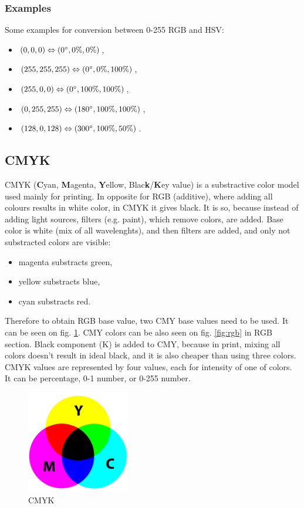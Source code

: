 \documentclass[titlepage]{article}
\begin{document}
\subsubsection{Examples}
Some examples for conversion between 0-255 RGB and HSV:
\begin{itemize}
  \item $(0, 0, 0) \Leftrightarrow (0\degree, 0\%, 0\%)$,
  \item $(255, 255, 255) \Leftrightarrow (0\degree, 0\%, 100\%)$,
  \item $(255, 0, 0) \Leftrightarrow (0\degree, 100\%, 100\%)$,
  \item $(0, 255, 255) \Leftrightarrow (180\degree, 100\%, 100\%)$,
  \item $(128, 0, 128) \Leftrightarrow (300\degree, 100\%, 50\%)$.
\end{itemize}

\subsection{CMYK}
CMYK (\textbf{C}yan, \textbf{M}agenta, \textbf{Y}ellow,
Blac\textbf{k}/\textbf{K}ey value) is a substractive color model used mainly for
printing. In opposite for RGB (additive), where adding all colours results in
white color, in CMYK it gives black. It is so, because instead of adding light
sources, filters (e.g. paint), which remove colors, are added. Base color is
white (mix of all wavelenghts), and then filters are added, and only not
substracted colors are visible:
\begin{itemize}
  \item magenta substracts green,
  \item yellow substracts blue,
  \item cyan substracts red.
\end{itemize}
Therefore to obtain RGB base value, two CMY base values need to be used. It can
be seen on fig. \ref{fig:cmyk}. CMY colors can be also seen on fig.
\ref{fig:rgb} in RGB section. Black component (K) is added to CMY, because in
print, mixing all colors doesn't result in ideal black, and it is also cheaper
than using three colors. CMYK values are represented by four values, each for
intensity of one of colors. It can be percentage, 0-1 number, or 0-255 number.

\begin{figure}[!htb]
	\centering
	\includegraphics[width=0.4\textwidth]{img/CMYK.png}
	\caption{CMYK} 
	\label{fig:cmyk}
\end{figure}
\end{document}
